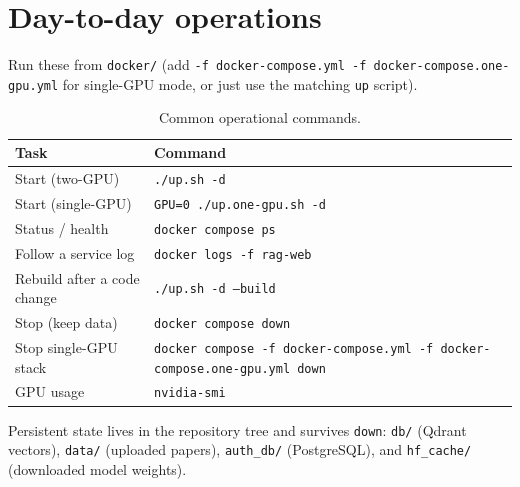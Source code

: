\documentclass[11pt,a4paper]{article}
\newcommand{\code}[1]{\texttt{\small #1}}
\begin{document}
\section{Day-to-day operations}
Run these from \code{docker/} (add \code{-f docker-compose.yml -f
docker-compose.one-gpu.yml} for single-GPU mode, or just use the matching
\code{up} script).

\begin{table}[H]
\centering\small
\renewcommand{\arraystretch}{1.25}
\begin{tabular}{>{\raggedright\arraybackslash}p{7.2cm}
                >{\raggedright\arraybackslash}p{6.6cm}}
\toprule
\textbf{Task} & \textbf{Command} \\
\midrule
Start (two-GPU)        & \code{./up.sh -d} \\
Start (single-GPU)     & \code{GPU=0 ./up.one-gpu.sh -d} \\
Status / health        & \code{docker compose ps} \\
Follow a service log   & \code{docker logs -f rag-web} \\
Rebuild after a code change & \code{./up.sh -d --build} \\
Stop (keep data)       & \code{docker compose down} \\
Stop single-GPU stack  & \code{docker compose -f docker-compose.yml -f docker-compose.one-gpu.yml down} \\
GPU usage              & \code{nvidia-smi} \\
\bottomrule
\end{tabular}
\caption{Common operational commands.}
\label{tab:ops}
\end{table}

\noindent Persistent state lives in the repository tree and survives
\code{down}: \code{db/} (Qdrant vectors), \code{data/} (uploaded papers),
\code{auth\_db/} (PostgreSQL), and \code{hf\_cache/} (downloaded model weights).

\end{document}
